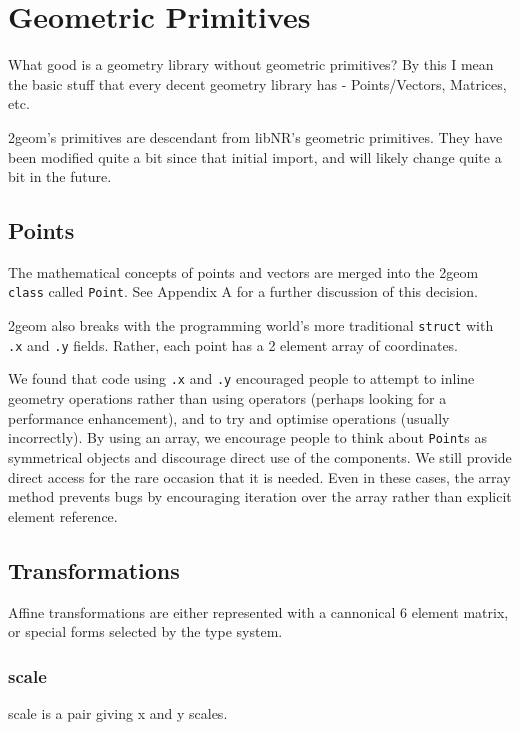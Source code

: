 \chapter{Geometric Primitives}

What good is a geometry library without geometric primitives?  By this
I mean the basic stuff that every decent geometry library has -
Points/Vectors, Matrices, etc.

2geom's primitives are descendant from libNR's geometric primitives.
They have been modified quite a bit since that initial import, and
will likely change quite a bit in the future.

\section{Points}

The mathematical concepts of points and vectors are merged into the
2geom \verb|class| called \verb|Point|.  See Appendix A for a further discussion of
this decision.

2geom also breaks with the programming world's more traditional
\verb|struct| with \verb|.x| and \verb|.y| fields.  Rather, each
point has a 2 element array of coordinates.

We found that code using \verb|.x| and \verb|.y| encouraged people
to attempt to inline geometry operations rather than using operators
(perhaps looking for a performance enhancement), and to try and
optimise operations (usually incorrectly).  By using an array, we
encourage people to think about \verb|Point|s as symmetrical objects
and discourage direct use of the components.  We still provide direct
access for the rare occasion that it is needed.  Even in these cases,
the array method prevents bugs by encouraging iteration over the
array rather than explicit element reference.

\section{Transformations}

Affine transformations are either represented with a cannonical 6
element matrix, or special forms selected by the type system.

\subsection{scale}

scale is a pair giving x and y scales.

